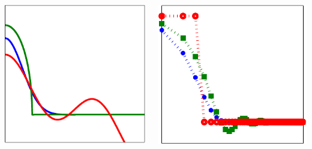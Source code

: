 \begin{frame}[fragile]
\begin{center}
\begin{columns}
\begin{column}{3.3cm}
		  \includegraphics[width=\columnwidth]{pic/RK} 
		\end{column}
		\begin{column}{3.3cm}
		  \includegraphics[width=\columnwidth]{pic/Fourier} 
	  \end{column}
	\end{columns}
\end{center}

\end{frame}

